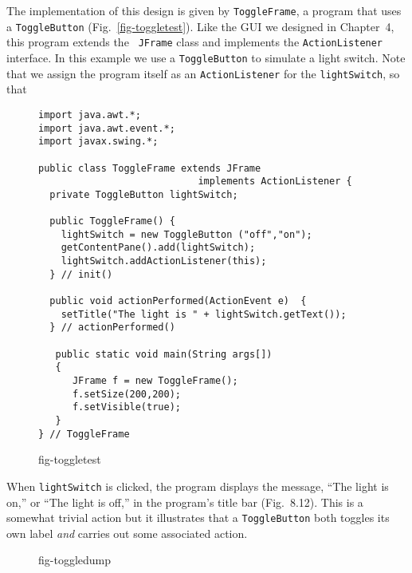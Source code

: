 The implementation of this design is given by {\tt ToggleFrame}, a
program that uses a {\tt ToggleButton} (Fig.~\ref{fig-toggletest}).
Like the GUI we designed in Chapter~4, this program extends the {\tt
JFrame} class and implements the {\tt ActionListener} interface.  In
this example we use a {\tt ToggleButton} to simulate a light switch.
Note that we assign the program itself as an {\tt ActionListener} for
the {\tt lightSwitch}, so that

\begin{figure}[tb]
\jjjprogstart
\begin{jjjlisting}
\begin{lstlisting}
import java.awt.*;
import java.awt.event.*;
import javax.swing.*;

public class ToggleFrame extends JFrame
                            implements ActionListener {
  private ToggleButton lightSwitch;  

  public ToggleFrame() {
    lightSwitch = new ToggleButton ("off","on");
    getContentPane().add(lightSwitch);
    lightSwitch.addActionListener(this);
  } // init()

  public void actionPerformed(ActionEvent e)  {
    setTitle("The light is " + lightSwitch.getText());
  } // actionPerformed()

   public static void main(String args[]) 
   {  
      JFrame f = new ToggleFrame();
      f.setSize(200,200);
      f.setVisible(true);
   }
} // ToggleFrame
\end{lstlisting}
\end{jjjlisting}
{fig-toggletest}
\end{figure}

When {\tt lightSwitch} is clicked, the program displays the message,
``The light is on,'' or ``The light is off,'' in the program's title
bar (Fig.~8.12). This is a somewhat trivial action but it illustrates
that a {\tt ToggleButton} both toggles its own label {\it and} carries
out some associated action.

\begin{figure}[h!]
 {fig-toggledump}

\end{figure}

